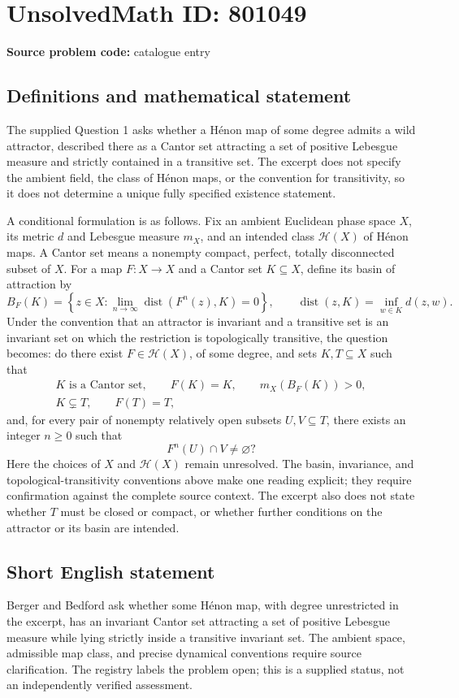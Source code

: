 \documentclass[11pt]{article}
\begin{document}
\section*{UnsolvedMath ID: 801049}
\textbf{Source problem code:} catalogue entry
\subsection{Definitions and mathematical statement}
The supplied Question 1 asks whether a H\'enon map of some degree admits a wild attractor, described there as a Cantor set attracting a set of positive Lebesgue measure and strictly contained in a transitive set. The excerpt does not specify the ambient field, the class of H\'enon maps, or the convention for transitivity, so it does not determine a unique fully specified existence statement.

A conditional formulation is as follows. Fix an ambient Euclidean phase space \(X\), its metric \(d\) and Lebesgue measure \(m_X\), and an intended class \(\mathcal H(X)\) of H\'enon maps. A Cantor set means a nonempty compact, perfect, totally disconnected subset of \(X\). For a map \(F\colon X\to X\) and a Cantor set \(K\subseteq X\), define its basin of attraction by
\[
 B_F(K)=\left\{z\in X:\lim_{n\to\infty}\operatorname{dist}(F^n(z),K)=0\right\},
 \qquad \operatorname{dist}(z,K)=\inf_{w\in K}d(z,w).
\]
Under the convention that an attractor is invariant and a transitive set is an invariant set on which the restriction is topologically transitive, the question becomes: do there exist \(F\in\mathcal H(X)\), of some degree, and sets \(K,T\subseteq X\) such that
\[
\begin{gathered}
 K\text{ is a Cantor set},\qquad F(K)=K,\qquad m_X(B_F(K))>0,\\
 K\subsetneq T,\qquad F(T)=T,
\end{gathered}
\]
and, for every pair of nonempty relatively open subsets \(U,V\subseteq T\), there exists an integer \(n\geq 0\) such that
\[
 F^n(U)\cap V\neq\varnothing?
\]
Here the choices of \(X\) and \(\mathcal H(X)\) remain unresolved. The basin, invariance, and topological-transitivity conventions above make one reading explicit; they require confirmation against the complete source context. The excerpt also does not state whether \(T\) must be closed or compact, or whether further conditions on the attractor or its basin are intended.
\subsection{Short English statement}
Berger and Bedford ask whether some H\'enon map, with degree unrestricted in the excerpt, has an invariant Cantor set attracting a set of positive Lebesgue measure while lying strictly inside a transitive invariant set. The ambient space, admissible map class, and precise dynamical conventions require source clarification. The registry labels the problem open; this is a supplied status, not an independently verified assessment.
\end{document}
